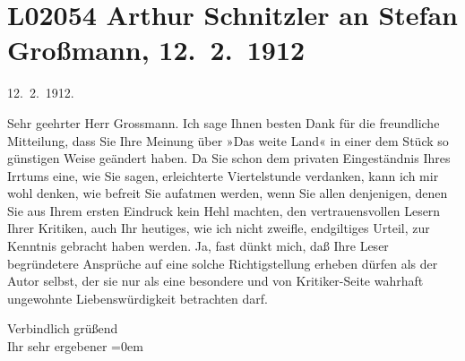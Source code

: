 

\section[Arthur Schnitzler an Stefan Großmann, 12. 2. 1912]{L02054 Arthur Schnitzler an Stefan Großmann, 12. 2. 1912}
\nopagebreak{}
\rehead{ }\normalsize\beginnumbering{}
\toendnotes[C]{\smallbreak\pagebreak[2]}
\pstart
           \raggedleft{}{\pb}12. 2. 1912.\pend
           
\pstart{}Sehr geehrter Herr Grossmann.\pend\vspace{0.5em}
\pstart
           Ich sage Ihnen besten Dank für die freundliche Mitteilung, dass Sie Ihre Meinung über
                  »Das weite Land« in einer dem Stück so
               günstigen Weise geändert haben. Da Sie schon dem privaten Eingeständnis Ihres Irrtums
               eine, wie Sie sagen, erleichterte Viertelstunde verdanken, kann ich mir wohl denken,
               wie befreit Sie aufatmen werden, wenn Sie allen denjenigen, {\pb}denen Sie aus Ihrem
               ersten Eindruck kein Hehl machten, den vertrauensvollen Lesern Ihrer Kritiken, auch
               Ihr heutiges, wie ich nicht zweifle, endgiltiges Urteil, zur Kenntnis gebracht haben
               werden. Ja, fast dünkt mich, daß Ihre Leser begründetere Ansprüche auf eine solche
               Richtigstellung erheben dürfen als der Autor selbst, der sie nur als eine besondere
               und von Kritiker-Seite wahrhaft ungewohnte Liebenswürdigkeit betrachten darf.\pend
           
\pstart
           Verbindlich grüßend{\\[\baselineskip]}Ihr sehr ergebener\pend
           \leftskip=0em{}\endnumbering{}  
      
